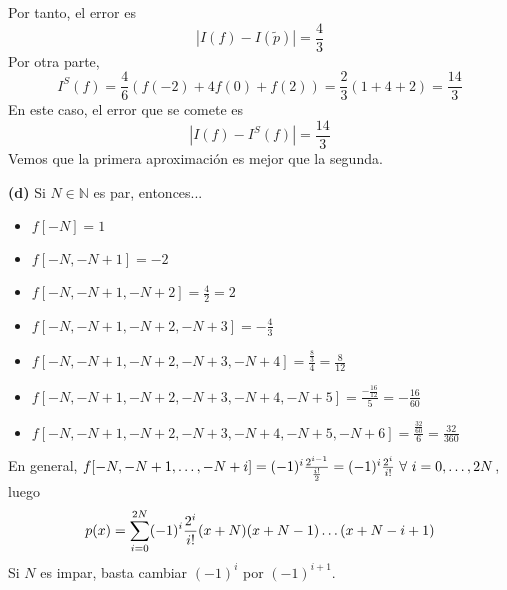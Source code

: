 \documentclass[12pt]{report}
\newcommand{\N}{\mathbb N}
\begin{document}
Por tanto, el error es
\[|I(f) - I(\tilde{p})| = \frac{4}{3}\]
Por otra parte,
\[I^S(f) = \frac{4}{6}(f(-2) + 4f(0) + f(2)) = \frac{2}{3}(1+4+2) = \frac{14}{3}\]
En este caso, el error que se comete es
\[|I(f) - I^S(f)| = \frac{14}{3}\]
Vemos que la primera aproximación es mejor que la segunda.

\vspace{2mm}
\textbf{(d) } Si $N \in \N$ es par, entonces...
\begin{itemize}
    \item $f[-N] = 1$
    \item $f[-N,-N+1] = -2$
    \item $f[-N,-N+1,-N+2] = \frac{4}{2} = 2$
    \item $f[-N,-N+1,-N+2,-N+3] = -\frac{4}{3}$
    \item $f[-N,-N+1,-N+2,-N+3,-N+4] = \frac{\frac{8}{3}}{4} = \frac{8}{12}$
    \item $f[-N,-N+1,-N+2,-N+3,-N+4,-N+5] = \frac{-\frac{16}{12}}{5} = -\frac{16}{60}$
    \item $f[-N,-N+1,-N+2,-N+3,-N+4,-N+5,-N+6] = \frac{\frac{32}{60}}{6} = \frac{32}{360}$
\end{itemize}
En general, $f[-N,-N+1,\mathellipsis,-N+i] = (-1)^i\frac{2^{i-1}}{\frac{i!}{2}} = (-1)^i\frac{2^i}{i!} \ \forall \ i = 0,\mathellipsis,2N$, luego
\[p(x) = \sum_{i = 0}^{2N} (-1)^i\frac{2^i}{i!}(x+N)(x+N-1) \mathellipsis (x+N-i+1)\]
Si $N$ es impar, basta cambiar $(-1)^i$ por $(-1)^{i+1}$.
\end{document}
